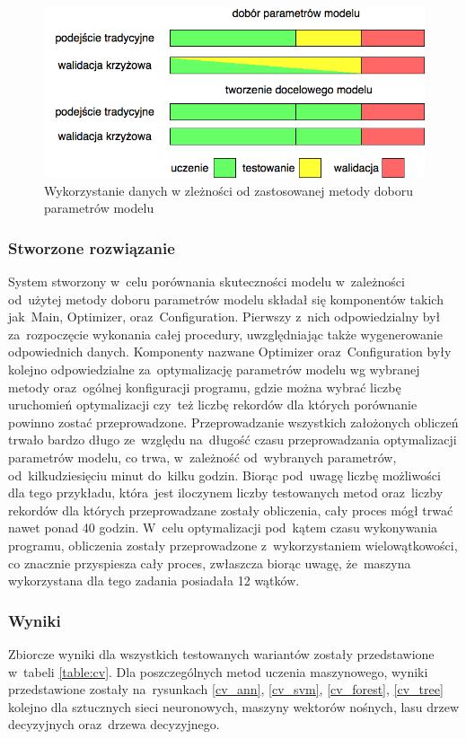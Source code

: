 \begin{figure}[ht!]
\centering
\includegraphics[scale=0.6]{res/cvdata.png}
\caption[Caption for LOF]{Wykorzystanie danych w zleżności od zastosowanej metody doboru parametrów modelu\label{cvdata}}
\end{figure} 

\subsubsection{Stworzone rozwiązanie}
System stworzony w~celu porównania skuteczności modelu w~zależności od~użytej metody doboru parametrów modelu składał się komponentów takich jak~Main, Optimizer, oraz~Configuration. Pierwszy z~nich odpowiedzialny był za~rozpoczęcie wykonania całej procedury, uwzględniając także wygenerowanie odpowiednich danych. Komponenty nazwane Optimizer oraz~Configuration były kolejno odpowiedzialne za~optymalizację parametrów modelu wg wybranej metody oraz~ogólnej konfiguracji programu, gdzie można wybrać liczbę uruchomień optymalizacji czy~też liczbę rekordów dla których porównanie powinno zostać przeprowadzone. Przeprowadzanie wszystkich założonych obliczeń trwało bardzo długo ze~względu na~długość czasu przeprowadzania optymalizacji parametrów modelu, co trwa, w~zależność od~wybranych parametrów, od~kilkudziesięciu minut do~kilku godzin. Biorąc pod~uwagę liczbę możliwości dla tego przykładu, która~jest iloczynem liczby testowanych metod oraz~liczby rekordów dla których przeprowadzane zostały obliczenia, cały proces mógł trwać nawet ponad 40 godzin. W~celu optymalizacji pod~kątem czasu wykonywania programu, obliczenia zostały przeprowadzone z~wykorzystaniem wielowątkowości, co znacznie przyspiesza cały proces, zwłaszcza biorąc uwagę, że~maszyna wykorzystana dla tego zadania posiadała 12 wątków. 
 
\subsubsection{Wyniki}
Zbiorcze wyniki dla wszystkich testowanych wariantów zostały przedstawione w~tabeli \ref{table:cv}. Dla poszczególnych metod uczenia maszynowego, wyniki przedstawione zostały na~rysunkach \ref{cv_ann}, \ref{cv_svm}, \ref{cv_forest}, \ref{cv_tree} kolejno dla sztucznych sieci neuronowych, maszyny wektorów nośnych, lasu drzew decyzyjnych oraz~drzewa decyzyjnego.

